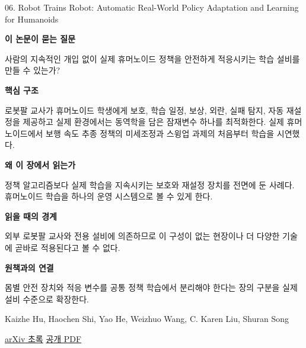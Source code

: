 \documentclass[11pt,openany]{book}
\begin{document}
\begin{termcard}{06. Robot Trains Robot: Automatic Real-World Policy Adaptation and Learning for Humanoids}

\par

\medskip

{\sffamily\bfseries\color{deepblue} 이 논문이 묻는 질문}\par

사람의 지속적인 개입 없이 실제 휴머노이드 정책을 안전하게 적응시키는 학습 설비를 만들 수 있는가?

\smallskip

{\sffamily\bfseries\color{deepblue} 핵심 구조}\par

로봇팔 교사가 휴머노이드 학생에게 보호, 학습 일정, 보상, 외란, 실패 탐지, 자동 재설정을 제공하고 실제 환경에서는 동역학을 담은 잠재변수 하나를 최적화한다. 실제 휴머노이드에서 보행 속도 추종 정책의 미세조정과 스윙업 과제의 처음부터 학습을 시연했다.

\smallskip

{\sffamily\bfseries\color{deepblue} 왜 이 장에서 읽는가}\par

정책 알고리즘보다 실제 학습을 지속시키는 보호와 재설정 장치를 전면에 둔 사례다. 휴머노이드 학습을 하나의 운영 시스템으로 볼 수 있게 한다.

\smallskip

{\sffamily\bfseries\color{coral} 읽을 때의 경계}\par

외부 로봇팔 교사와 전용 설비에 의존하므로 이 구성이 없는 현장이나 더 다양한 기술에 곧바로 적용된다고 볼 수 없다.

\smallskip

{\sffamily\bfseries\color{teal} 원책과의 연결}\par

몸별 안전 장치와 적응 변수를 공통 정책 학습에서 분리해야 한다는 장의 구분을 실제 설비 수준으로 확장한다.

\medskip

{\footnotesize\color{muted} Kaizhe Hu, Haochen Shi, Yao He, Weizhuo Wang, C. Karen Liu, Shuran Song\par

\href{https://arxiv.org/abs/2508.12252}{arXiv 초록} \quad \href{https://arxiv.org/pdf/2508.12252}{공개 PDF}\par}

\end{termcard}
\end{document}
